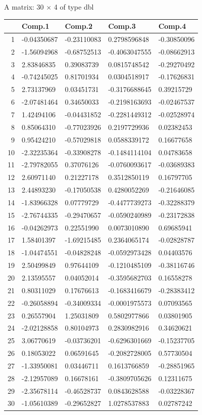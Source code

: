 \documentclass[UTF8,a4paper]{ctexart}
\begin{document}
    A matrix: 30 × 4 of type dbl
\begin{tabular}{r|llll}
  & Comp.1 & Comp.2 & Comp.3 & Comp.4\\
\hline
	1 & -0.04350687 & -0.23110083 &  0.2798596848 & -0.30850096\\
	2 & -1.56094968 & -0.68752513 & -0.4063047555 & -0.08662913\\
	3 &  2.83846835 &  0.39083739 &  0.0815748542 & -0.29270492\\
	4 & -0.74245025 &  0.81701934 &  0.0304518917 & -0.17626831\\
	5 &  2.73137969 &  0.03451731 & -0.3176688645 &  0.39215729\\
	6 & -2.07481464 &  0.34650033 & -0.2198163693 & -0.02467537\\
	7 &  1.42494106 & -0.04431852 & -0.2281449312 & -0.02528974\\
	8 &  0.85064310 & -0.77023926 &  0.2197729936 &  0.02382453\\
	9 &  0.95424210 & -0.57029818 &  0.0588339172 &  0.16677658\\
	10 & -2.32235364 & -0.33908278 & -0.1484114104 &  0.04783658\\
	11 & -2.79782055 &  0.37076126 & -0.0760093617 & -0.03689383\\
	12 &  2.60971140 &  0.21227178 &  0.3512850119 &  0.16797705\\
	13 &  2.44893230 & -0.17050538 &  0.4280052269 & -0.21646085\\
	14 & -1.83966328 &  0.07779729 & -0.4477739273 & -0.32288379\\
	15 & -2.76744335 & -0.29470657 & -0.0590240989 & -0.23172838\\
	16 & -0.04262973 &  0.22551990 &  0.0073010890 &  0.69685941\\
	17 &  1.58401397 & -1.69215485 &  0.2364065174 & -0.02828787\\
	18 & -1.04474551 & -0.04828248 & -0.0592973428 &  0.04403576\\
	19 &  2.50499849 &  0.97644109 & -0.1210485109 & -0.38116746\\
	20 &  2.13595557 &  0.04052014 & -0.3595682703 &  0.16558278\\
	21 &  0.80311029 &  0.17676613 & -0.1683416679 & -0.28383412\\
	22 & -0.26058894 & -0.34009334 & -0.0001975573 &  0.07093565\\
	23 &  0.26557904 &  1.25031809 &  0.5802977866 &  0.03801905\\
	24 & -2.02128858 &  0.80104973 &  0.2830982916 &  0.34620621\\
	25 &  3.06770619 & -0.03736201 & -0.6296301669 & -0.15237705\\
	26 &  0.18053022 &  0.06591645 & -0.2082728005 &  0.57730504\\
	27 & -1.33950081 &  0.03446711 &  0.1613766859 & -0.28851965\\
	28 & -2.12957089 &  0.16678161 & -0.3809705626 &  0.12311675\\
	29 & -2.35678114 & -0.46528737 &  0.0843628588 & -0.03228367\\
	30 & -1.05610389 & -0.29652827 &  1.0278537883 &  0.02787242\\
\end{tabular}
\end{document}
